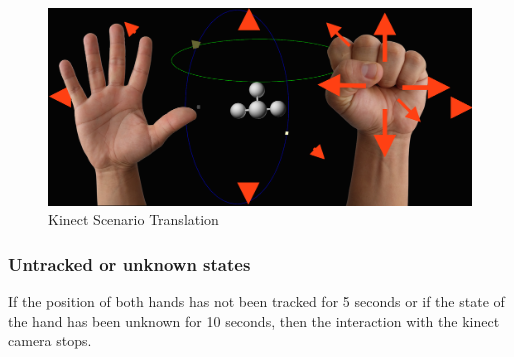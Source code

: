 \documentclass[12pt]{extarticle}
\begin{document}
\begin{appendices}
\begin{center}
\begin{figure}[!h]
\includegraphics[scale=0.4]{Images/KinectMoveScenario.png}
\caption{Kinect Scenario Translation}
\label{fig: AKMS}
\end{figure}
\end{center}
\subsubsection {Untracked or unknown states} 
If the position of both hands has not been tracked for 5 seconds or if the state of the hand has been unknown for 10 seconds, then the interaction with the kinect camera stops.
\end{appendices}
\end{document}
